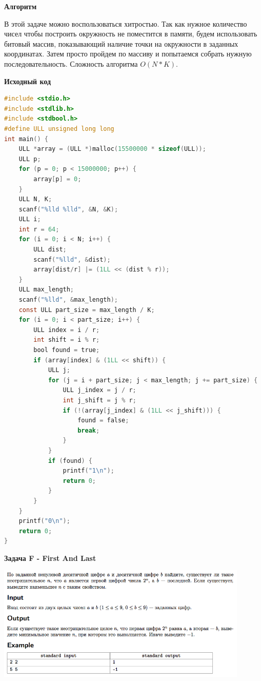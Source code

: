 \documentclass[a4paper,12pt]{article}
\begin{document}
\textbf{{\large Алгоритм}}

В этой задаче можно воспользоваться хитростью. Так как нужное количество чисел чтобы построить окружность не поместится в памяти, будем использовать битовый массив, показывающий наличие точки на окружности в заданных координатах. Затем просто пройдем по массиву и попытаемся собрать нужную последовательность. Сложность алгоритма $O(N * K)$.

\newpage
\textbf{{\large Исходный код}} \\
\begin{lstlisting}[language=C]
#include <stdio.h>
#include <stdlib.h>
#include <stdbool.h>
#define ULL unsigned long long
int main() {
    ULL *array = (ULL *)malloc(15500000 * sizeof(ULL));
    ULL p;
    for (p = 0; p < 15000000; p++) {
        array[p] = 0;
    }
    ULL N, K;
    scanf("%lld %lld", &N, &K);
    ULL i;
    int r = 64;
    for (i = 0; i < N; i++) {
        ULL dist;
        scanf("%lld", &dist);
        array[dist/r] |= (1LL << (dist % r));
    }
    ULL max_length;
    scanf("%lld", &max_length);
    const ULL part_size = max_length / K;
    for (i = 0; i < part_size; i++) {
        ULL index = i / r;
        int shift = i % r;
        bool found = true;
        if (array[index] & (1LL << shift)) {
            ULL j;
            for (j = i + part_size; j < max_length; j += part_size) {
                ULL j_index = j / r;
                int j_shift = j % r;
                if (!(array[j_index] & (1LL << j_shift))) {
                    found = false;
                    break;
                }
            }
            if (found) {
                printf("1\n");
                return 0;
            }
        }
    }
    printf("0\n");
    return 0;
}
\end{lstlisting}


\newpage
\textbf{{\large Задача F - First And Last}}

\begin{center}
\includegraphics[width=0.9\textwidth]{OC_Ukraine/F.png}\\ [1cm]
\end{center}
\end{document}
